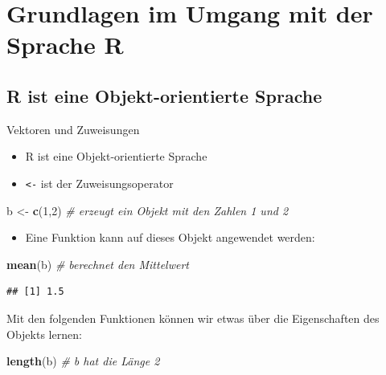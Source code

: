 \documentclass[]{article}
\newenvironment{Shaded}{\begin{snugshade}}{\end{snugshade}}
\newcommand{\KeywordTok}[1]{\textcolor[rgb]{0.13,0.29,0.53}{\textbf{{#1}}}}
\newcommand{\DecValTok}[1]{\textcolor[rgb]{0.00,0.00,0.81}{{#1}}}
\newcommand{\StringTok}[1]{\textcolor[rgb]{0.31,0.60,0.02}{{#1}}}
\newcommand{\CommentTok}[1]{\textcolor[rgb]{0.56,0.35,0.01}{\textit{{#1}}}}
\newcommand{\NormalTok}[1]{{#1}}
\providecommand{\tightlist}{%
  \setlength{\itemsep}{0pt}\setlength{\parskip}{0pt}}
\begin{document}
\section{Grundlagen im Umgang mit der Sprache
R}\label{grundlagen-im-umgang-mit-der-sprache-r}

\subsection{R ist eine Objekt-orientierte
Sprache}\label{r-ist-eine-objekt-orientierte-sprache}

Vektoren und Zuweisungen

\begin{itemize}
\tightlist
\item
  R ist eine Objekt-orientierte Sprache
\item
  \texttt{\textless{}-} ist der Zuweisungsoperator
\end{itemize}

\begin{Shaded}
\begin{Highlighting}[]
\NormalTok{b <-}\StringTok{ }\KeywordTok{c}\NormalTok{(}\DecValTok{1}\NormalTok{,}\DecValTok{2}\NormalTok{) }\CommentTok{# erzeugt ein Objekt mit den Zahlen 1 und 2}
\end{Highlighting}
\end{Shaded}

\begin{itemize}
\tightlist
\item
  Eine Funktion kann auf dieses Objekt angewendet werden:
\end{itemize}

\begin{Shaded}
\begin{Highlighting}[]
\KeywordTok{mean}\NormalTok{(b) }\CommentTok{# berechnet den Mittelwert}
\end{Highlighting}
\end{Shaded}

\begin{verbatim}
## [1] 1.5
\end{verbatim}

Mit den folgenden Funktionen können wir etwas über die Eigenschaften des
Objekts lernen:

\begin{Shaded}
\begin{Highlighting}[]
\KeywordTok{length}\NormalTok{(b) }\CommentTok{# b hat die Länge 2}
\end{Highlighting}
\end{Shaded}
\end{document}
